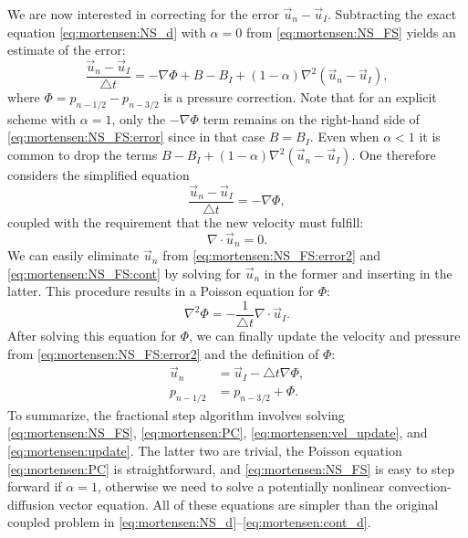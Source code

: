 We are now interested in correcting for the error $\vec{u}_n-\vec{u}_I$.
Subtracting the exact equation \eqref{eq:mortensen:NS_d} with $\alpha =
0$ from \eqref{eq:mortensen:NS_FS} yields an estimate of the error:
\begin{equation}
\label{eq:mortensen:NS_FS:error}
\frac{{\vec{u}}_{n}-\vec{u}_{I}}{\triangle t} =
-\nabla\Phi + B - B_I + (1-\alpha )\nabla^2(\vec{u}_n-\vec{u}_I),
\end{equation}
where $\Phi = p_{n-1/2} - p_{n-3/2} $ is a pressure correction.  Note that
for an explicit scheme with $\alpha = 1$, only the $-\nabla\Phi$ term
remains on the right-hand side of \eqref{eq:mortensen:NS_FS:error}
since in that case $B = B_I$. Even when $\alpha < 1$ it is common to
drop the terms $B - B_I + (1 - \alpha)\nabla^2(\vec{u}_n-\vec{u}_I)$.
One therefore considers the simplified equation
\begin{equation}
\label{eq:mortensen:NS_FS:error2}
\frac{{\vec{u}}_{n}-\vec{u}_{I}}{\triangle t} =
-\nabla\Phi,
\end{equation}
coupled with the requirement that the new velocity must fulfill:
\begin{equation}
 \label{eq:mortensen:NS_FS:cont} \nabla \cdot \vec{u}_{n} =0.
\end{equation}
We can easily eliminate $\vec{u}_{n}$ from
\eqref{eq:mortensen:NS_FS:error2} and
\eqref{eq:mortensen:NS_FS:cont} by solving for $\vec{u}_{n}$ in the
former and inserting in the latter. This procedure results in a
Poisson equation for $\Phi$:
\begin{equation}
 \label{eq:mortensen:PC} \nabla^2 \Phi = -\frac{1}{\triangle t} \nabla \cdot {\vec{u}}_{I} .
\end{equation}
After solving this equation for $\Phi$, we can finally update the
velocity and pressure from \eqref{eq:mortensen:NS_FS:error2} and the
definition of $\Phi$:
\begin{align}
 \label{eq:mortensen:vel_update} \vec{u}_{n} &= {\vec{u}}_{I} - \triangle t \nabla \Phi, \\
  p_{n-1/2} &= p_{n-3/2} + \Phi .
\label{eq:mortensen:update}
\end{align}
To summarize, the fractional step algorithm involves
solving \eqref{eq:mortensen:NS_FS}, \eqref{eq:mortensen:PC},
\eqref{eq:mortensen:vel_update}, and \eqref{eq:mortensen:update}. The
latter two are trivial, the Poisson equation \eqref{eq:mortensen:PC}
is straightforward, and \eqref{eq:mortensen:NS_FS} is easy to step
forward if $\alpha=1$, otherwise we need to solve a potentially
nonlinear convection-diffusion vector equation.  All of these
equations are simpler than the original coupled problem in
\eqref{eq:mortensen:NS_d}--\eqref{eq:mortensen:cont_d}.

